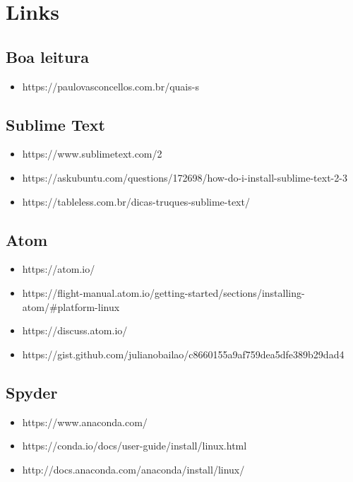 \section{Links}

\subsection{Boa leitura}
\begin{itemize}
    \item https://paulovasconcellos.com.br/quais-s%
\end{itemize}

\subsection{Sublime Text}
\begin{itemize}
    \item https://www.sublimetext.com/2
    \item https://askubuntu.com/questions/172698/how-do-i-install-sublime-text-2-3
    \item https://tableless.com.br/dicas-truques-sublime-text/
\end{itemize}

\subsection{Atom}
\begin{itemize}
    \item https://atom.io/
    \item https://flight-manual.atom.io/getting-started/sections/installing-atom/#platform-linux
    \item https://discuss.atom.io/
    \item https://gist.github.com/julianobailao/c8660155a9af759dea5dfe389b29dad4
\end{itemize}

\subsection{Spyder}
\begin{itemize}
    \item https://www.anaconda.com/
    \item https://conda.io/docs/user-guide/install/linux.html
    \item http://docs.anaconda.com/anaconda/install/linux/
\end{itemize}